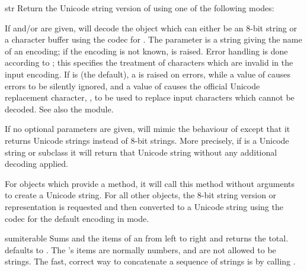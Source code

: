 \begin{funcdesc}{str}{}
  Return the Unicode string version of  using one of the
  following modes:

  If  and/or  are given, 
  will decode the object which can either be an 8-bit string or a
  character buffer using the codec for . The
   parameter is a string giving the name of an encoding;
  if the encoding is not known,  is raised.
  Error handling is done according to ; this specifies the
  treatment of characters which are invalid in the input encoding.  If
   is  (the default), a
   is raised on errors, while a value of
   causes errors to be silently ignored, and a value of
   causes the official Unicode replacement character,
  , to be used to replace input characters which cannot
  be decoded.  See also the  module.

  If no optional parameters are given,  will mimic the
  behaviour of  except that it returns Unicode strings
  instead of 8-bit strings. More precisely, if  is a
  Unicode string or subclass it will return that Unicode string without
  any additional decoding applied.

  For objects which provide a  method, it will
  call this method without arguments to create a Unicode string. For
  all other objects, the 8-bit string version or representation is
  requested and then converted to a Unicode string using the codec for
  the default encoding in  mode.

\end{funcdesc}

\begin{funcdesc}{sum}{iterable}
  Sums  and the items of an  from left to
  right and returns the total.   defaults to .
  The 's items are normally numbers, and are not allowed
  to be strings.  The fast, correct way to concatenate a sequence of
  strings is by calling .
\end{funcdesc}

